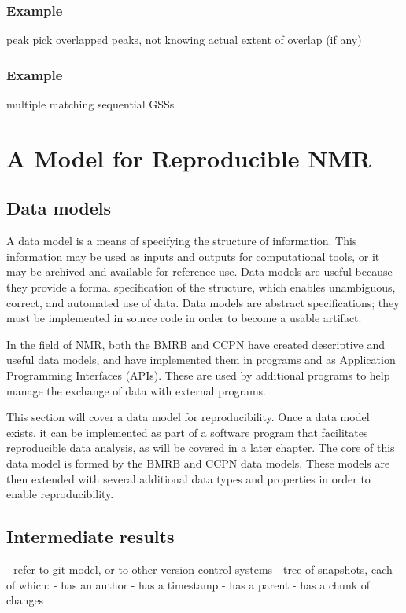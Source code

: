 \subsubsection{Example}
peak pick overlapped peaks, not knowing actual extent of overlap (if any)

\subsubsection{Example}
multiple matching sequential GSSs


\section{A Model for Reproducible NMR}

\subsection{Data models}
A data model is a means of specifying the structure of information.  This
information may be used as inputs and outputs for computational tools, or
it may be archived and available for reference use.  Data models are useful
because they provide a formal specification of the structure, which enables
unambiguous, correct, and automated use of data.  Data models are
abstract specifications; they must be implemented in source code in order
to become a usable artifact.

In the field of NMR, both the BMRB \cite{bmrb} and CCPN \cite{ccpn} have
created descriptive and useful data models, and have implemented them in
programs and as Application Programming Interfaces (APIs).  These are used
by additional programs to help manage the exchange of data with external
programs.

This section will cover a data model for reproducibility.  Once a data
model exists, it can be implemented as part of a software program that
facilitates reproducible data analysis, as will be covered in a later 
chapter.  The core of this data model is formed by the BMRB \cite{bmrb}
and CCPN \cite{ccpn} data models.  These models are then extended with
several additional data types and properties in order to enable 
reproducibility.

\subsection{Intermediate results}
 - refer to git model, or to other version control systems
 - tree of snapshots, each of which:
   - has an author
   - has a timestamp
   - has a parent
   - has a chunk of changes
